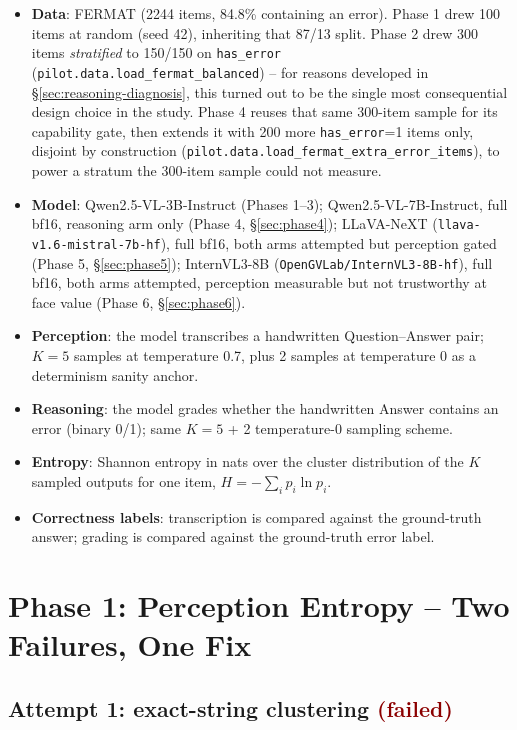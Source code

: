\documentclass[11pt]{article}
\newcommand{\failed}[1]{\textcolor{darkred}{\textbf{#1}}}
\begin{document}
\begin{itemize}
  \item \textbf{Data}: FERMAT (2244 items, 84.8\% containing an error).
    Phase 1 drew 100 items at random (seed 42), inheriting that 87/13 split.
    Phase 2 drew 300 items \emph{stratified} to 150/150 on \verb|has_error|
    (\texttt{pilot.data.load\_fermat\_balanced}) -- for reasons developed in
    \S\ref{sec:reasoning-diagnosis}, this turned out to be the single most
    consequential design choice in the study. Phase 4 reuses that same
    300-item sample for its capability gate, then extends it with 200 more
    \verb|has_error|=1 items only, disjoint by construction
    (\texttt{pilot.data.load\_fermat\_extra\_error\_items}), to power a
    stratum the 300-item sample could not measure.
  \item \textbf{Model}: Qwen2.5-VL-3B-Instruct (Phases 1--3);
    Qwen2.5-VL-7B-Instruct, full bf16, reasoning arm only (Phase 4,
    \S\ref{sec:phase4}); LLaVA-NeXT (\texttt{llava-v1.6-mistral-7b-hf}),
    full bf16, both arms attempted but perception gated (Phase 5,
    \S\ref{sec:phase5}); InternVL3-8B (\texttt{OpenGVLab/InternVL3-8B-hf}),
    full bf16, both arms attempted, perception measurable but not
    trustworthy at face value (Phase 6, \S\ref{sec:phase6}).
  \item \textbf{Perception}: the model transcribes a handwritten Question--Answer
    pair; $K=5$ samples at temperature 0.7, plus 2 samples at temperature 0 as a
    determinism sanity anchor.
  \item \textbf{Reasoning}: the model grades whether the handwritten Answer
    contains an error (binary 0/1); same $K=5$ + 2 temperature-0 sampling scheme.
  \item \textbf{Entropy}: Shannon entropy in nats over the cluster distribution
    of the $K$ sampled outputs for one item, $H = -\sum_i p_i \ln p_i$.
  \item \textbf{Correctness labels}: transcription is compared against the
    ground-truth answer; grading is compared against the ground-truth
    error label.
\end{itemize}

\section{Phase 1: Perception Entropy -- Two Failures, One Fix}
\label{sec:perception}

\subsection{Attempt 1: exact-string clustering \failed{(failed)}}
\end{document}
